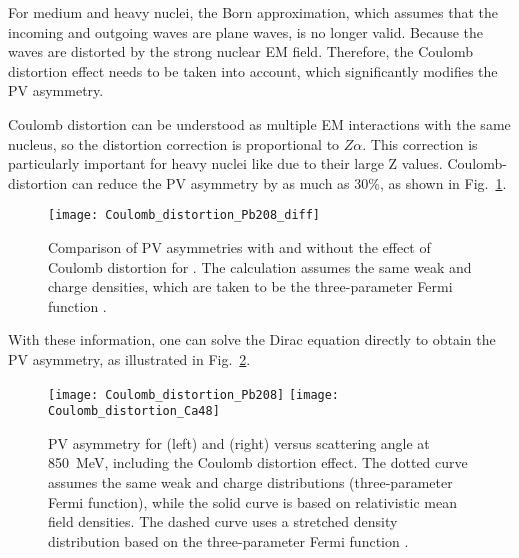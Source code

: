 For medium and heavy nuclei, the Born approximation, which assumes that 
the incoming and outgoing waves are plane waves, is no longer valid.
Because the waves are distorted by the strong nuclear EM field. 
Therefore, the Coulomb distortion effect needs to be taken into account, 
which significantly modifies the PV asymmetry.

Coulomb distortion can be understood as multiple EM interactions with
the same nucleus, so the distortion correction is proportional to $Z\alpha$. 
This correction is particularly important for heavy nuclei like \Pb due to their
large Z values. Coulomb-distortion can reduce the PV asymmetry by as much as 30\%,
as shown in Fig.~\ref{fig:diff_by_Coulomb_distortion}.
\begin{figure}[H]
    \centering
    \texttt{[image: Coulomb\_distortion\_Pb208\_diff]}
    \caption[Coulomb distortion]
    {Comparison of PV asymmetries with and without the effect of Coulomb
    distortion for \Pb. The calculation assumes the same weak and charge densities,
    which are taken to be the three-parameter Fermi function \cite{PhysRevC.57.3430}.
    }
    \label{fig:diff_by_Coulomb_distortion}
\end{figure}

With these information, one can solve the Dirac equation directly to obtain
the PV asymmetry, as illustrated in Fig.~\ref{fig:Coulomb_distortion}.

\begin{figure}[!h]
    \texttt{[image: Coulomb\_distortion\_Pb208]}
    \texttt{[image: Coulomb\_distortion\_Ca48]}
    \caption[PV asymmetry for \Pb and \Ca]
    {PV asymmetry for \Pb (left) and \Ca (right) versus scattering angle 
    at 850~MeV, including the Coulomb distortion effect. 
    The dotted curve assumes the same weak and charge distributions (three-parameter Fermi function), 
    while the solid curve is based on relativistic mean field densities.
    The dashed curve uses a stretched density distribution based on the three-parameter Fermi function \cite{PhysRevC.57.3430}.
    }
    \label{fig:Coulomb_distortion}
\end{figure}

